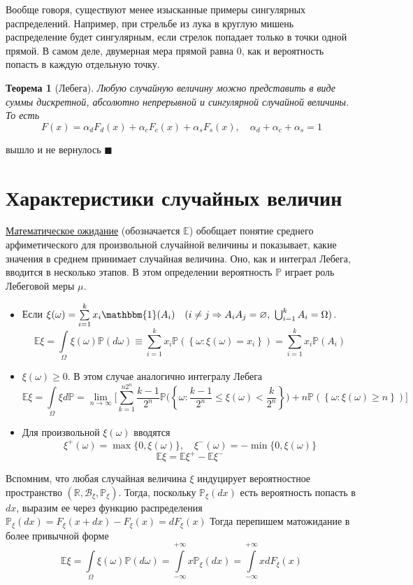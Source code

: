 \documentclass[12pt]{article}
\newtheorem{Th}{Теорема}
\newenvironment{Proof}{\par\noindent{\bf Доказательство}}{$\blacksquare$}
\numberwithin{Th}{section}
\numberwithin{Def}{section}
\numberwithin{Lem}{section}
\numberwithin{St}{section}
\numberwithin{equation}{section}
\newcommand\Set[2]{\left\{ #1 \colon #2 \right\}}
\newcommand\Pro{\mathbb{P}} %
\newcommand\Bor{\mathscr{B}} %
\newcommand\Real{\mathbb{R}} %
\newcommand\Expec{\mathbb{E}} %
\newcommand\Ind{\mathbbm{1}} %
\begin{document}
Вообще говоря, существуют менее изысканные примеры сингулярных распределений. Например, при стрельбе из лука в круглую мишень распределение будет сингулярным,
если стрелок попадает только в точки одной прямой. В самом деле, двумерная мера прямой равна 0, как и вероятность попасть в каждую отдельную точку. 

\begin{Th} [Лебега]
	Любую случайную величину можно представить в виде суммы дискретной, абсолютно непрерывной и сингулярной случайной величины. То есть 
	$$ F(x) = \alpha_dF_d(x) + \alpha_cF_c(x) + \alpha_sF_s(x), \quad \alpha_d + \alpha_c + \alpha_s = 1$$
\end{Th}
\begin{Proof}
вышло и не вернулось
\end{Proof}

\newpage
\section{Характеристики случайных величин}

\underline{Математическое ожидание} (обозначается $\Expec$) обобщает понятие среднего арфиметического для произвольной случайной величины и показывает, какие значения в среднем принимает случайная величина. Оно, как и интеграл Лебега, вводится в несколько этапов. В этом определении вероятность $\Pro$ играет роль
Лебеговой меры $\mu$.

\begin{itemize}
 	\item Если $\xi(\omega) = \sum\limits_{i=1}^kx_i \Ind(A_i) \quad (i \not= j \Rightarrow A_iA_j = \varnothing, \ \bigcup_{i=1}^k A_i= \Omega)$. 
 	$$\Expec \xi = \int\limits_{\Omega} \xi(\omega) \Pro(d\omega) \equiv \sum\limits_{i=1}^k x_i \Pro(\Set{\omega}{\xi(\omega)=x_i}) =  \sum\limits_{i=1}^k x_i \Pro(A_i)$$
	\item $\xi(\omega) \ge 0$. В этом случае аналогично интегралу Лебега
	$$ \Expec \xi = \int\limits_{\Omega} \xi d\Pro = \lim_{n \to \infty}  \biggl[  \sum\limits_{k=1}^{n2^n} \frac{k-1}{2^n} \Pro\biggl(\Set{\omega}{\frac{k-1}{2^n} \le \xi(\omega) < \frac{k}{2^n}}\biggl) 
	+ n \Pro(\Set{\omega}{\xi(\omega) \ge n})\biggl]$$
	\item Для произвольной $\xi(\omega)$ вводятся
	$$ \xi^+(\omega) = \max\{0, \xi(\omega)\},\quad \xi^-(\omega) = -\min\{0, \xi(\omega)\}$$
	$$ \Expec \xi = \Expec \xi^+ - \Expec \xi^-$$
\end{itemize}

Вспомним, что любая случайная величина $\xi$ индуцирует вероятностное пространство $(\Real, \Bor_\xi, \Pro_\xi)$. Тогда, поскольку $\Pro_\xi(dx)$ есть вероятность попасть
в $dx$, выразим ее через функцию распределения $\Pro_\xi(dx) = F_\xi(x + dx) - F_\xi(x) = dF_\xi(x)$ Тогда перепишем матожидание в более привычной форме
$$\Expec\xi = \int\limits_{\Omega} \xi(\omega) \Pro(d\omega) = \int\limits_{-\infty}^{+\infty} x \Pro_\xi(dx) = \int\limits_{-\infty}^{+\infty} x dF_\xi(x)$$
\end{document}
